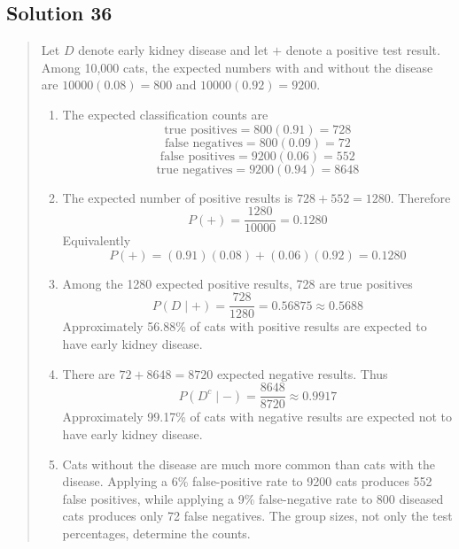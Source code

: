 \documentclass[10pt,letterpaper]{article}
\newcommand{\solutionheading}[1]{%
  \subsection*{Solution #1}
}
\newenvironment{answer}{%
  \begin{quote}\small\color{black}
}{%
  \end{quote}
}
\begin{document}
\solutionheading{36}
\begin{answer}
Let $D$ denote early kidney disease and let $+$ denote a positive test result. Among 10,000 cats, the expected numbers with and without the disease are $10000(0.08)=800$ and
$10000(0.92)=9200$.
\begin{enumerate}
	\item The expected classification counts are
	$$\text{true positives}=800(0.91)=728$$
	$$\text{false negatives}=800(0.09)=72$$
	$$\text{false positives}=9200(0.06)=552$$
	$$\text{true negatives}=9200(0.94)=8648$$
	\item The expected number of positive results is $728+552=1280$. Therefore
	$$P(+)=\frac{1280}{10000}=0.1280$$
	Equivalently
	$$P(+)=(0.91)(0.08)+(0.06)(0.92)=0.1280$$
	\item Among the 1280 expected positive results, 728 are true positives
	$$P(D\mid+)=\frac{728}{1280}=0.56875\approx0.5688$$
  	Approximately 56.88\% of cats with positive results are expected to have early kidney disease.
  	\item There are $72+8648=8720$ expected negative results. Thus
	$$P(D^c\mid-)=\frac{8648}{8720}\approx0.9917$$
  	Approximately 99.17\% of cats with negative results are expected not to have early kidney disease.
	\item Cats without the disease are much more common than cats with the disease. Applying a 6\% false-positive rate to 9200 cats produces 552 false positives, while applying a 9\% false-negative rate to 800 diseased cats produces only 72 false negatives. The group sizes, not only the test percentages, determine the counts.
\end{enumerate}
\end{answer}
\end{document}
